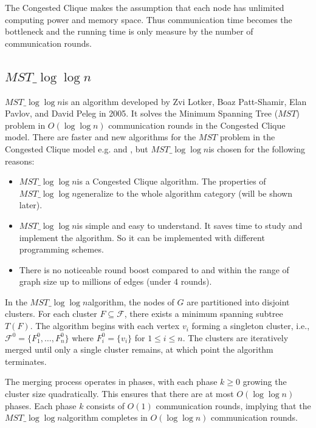 \documentclass[english, 12pt, a4paper, elec, utf8, a-2b, online]{aaltothesis}
\newcommand{\mstalgo}{$MST\_\log\log{n}$}
\begin{document}
The Congested Clique makes the assumption that each node has unlimited computing power and memory space. Thus communication time becomes the bottleneck and the running time is only measure by the number of communication rounds.
\subsection{\mstalgo}
\mstalgo is an algorithm developed by Zvi Lotker, Boaz Patt-Shamir, Elan Pavlov, and David Peleg in 2005. It solves the Minimum Spanning Tree ($MST$) problem in $O(\log{\log{n}})$ communication rounds in the Congested Clique model. There are faster and new algorithms for the $MST$ problem in the Congested Clique model e.g. \cite{MSTLogStar} and \cite{MSTConstant}, but \mstalgo is chosen for the following reasons: 
\begin{itemize}
	\item[--] \mstalgo is a Congested Clique algorithm. The properties of \mstalgo generalize to the whole algorithm category (will be shown later).
	\item[--] \mstalgo is simple and easy to understand. It saves time to study and implement the algorithm. So it can be implemented with different programming schemes.
	\item[--] There is no noticeable round boost compared to \cite{MSTLogStar} and \cite{MSTConstant} within the range of graph size up to millions of edges (under 4 rounds).
\end{itemize}
In the \mstalgo algorithm, the nodes of \( G \) are partitioned into disjoint clusters. For each cluster \( F \subseteq \mathcal{F} \), there exists a minimum spanning subtree \( T(F) \). The algorithm begins with each vertex \( v_i \) forming a singleton cluster, i.e., \( \mathcal{F}^0 = \{ F_1^0, \dots, F_n^0 \} \) where \( F_i^0 = \{ v_i \} \) for \( 1 \leq i \leq n \). The clusters are iteratively merged until only a single cluster remains, at which point the algorithm terminates.

The merging process operates in phases, with each phase \( k \geq 0 \) growing the cluster size quadratically. This ensures that there are at most \( O(\log \log n) \) phases. Each phase \( k \) consists of \( O(1) \) communication rounds, implying that the \mstalgo algorithm completes in \( O(\log \log n) \) communication rounds.
\end{document}
